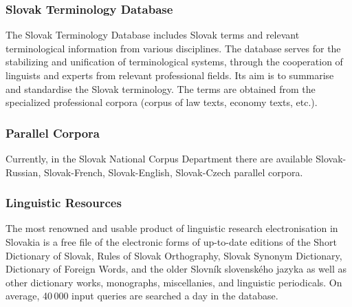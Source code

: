 \begin{multicols}{2}
\subsubsection{Slovak Terminology Database}
The Slovak Terminology Database
\cite{f15} includes Slovak terms
and relevant terminological information from various disciplines. The
database serves for the stabilizing and unification of terminological
systems, through the cooperation of linguists and experts from relevant
professional fields. Its aim is to summarise and standardise the Slovak 
terminology. The terms are obtained from the specialized professional
corpora (corpus of law texts, economy texts, etc.).

\subsubsection{Parallel Corpora}
Currently, in the Slovak National Corpus Department there are available
Slovak-Russian\cite{f16},
Slovak-French\cite{f17},
Slovak-English\cite{f18},
Slovak-Czech\cite{f19} parallel
corpora.

\subsubsection{Linguistic Resources}
The most renowned and usable product of linguistic research
electronisation in Slovakia is a free file of the electronic forms of
up-to-date editions of the Short Dictionary of Slovak, Rules of Slovak
Orthography, Slovak Synonym Dictionary, Dictionary of Foreign Words, and
the older Slovník slovenského
jazyka\cite{f20} as well as other
dictionary works, monographs, miscellanies, and linguistic
periodicals\cite{f21}. On average,
40\,000 input queries are searched a day in the database.

\end{multicols}

\clearpage

